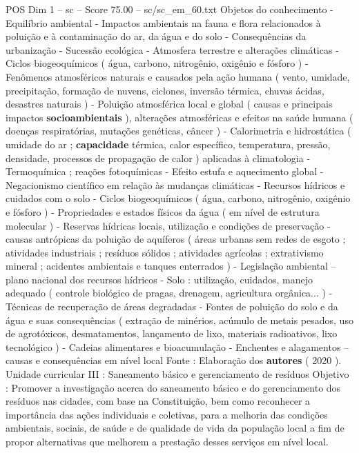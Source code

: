 \begin{textsample}{POS Dim 1 – sc – Score 75.00 – sc/sc\_em\_60.txt}
Objetos do conhecimento - Equilíbrio ambiental - Impactos ambientais na fauna e flora relacionados à poluição e à contaminação do ar, da água e do solo - Consequências da urbanização - Sucessão ecológica - Atmosfera terrestre e alterações climáticas - Ciclos biogeoquímicos ( água, carbono, nitrogênio, oxigênio e fósforo ) - Fenômenos atmosféricos naturais e causados pela ação humana ( vento, umidade, precipitação, formação de nuvens, ciclones, inversão térmica, chuvas ácidas, desastres naturais ) - Poluição atmosférica local e global ( causas e principais impactos \textbf{socioambientais} ), alterações atmosféricas e efeitos na saúde humana ( doenças respiratórias, mutações genéticas, câncer ) - Calorimetria e hidrostática ( umidade do ar ; \textbf{capacidade} térmica, calor específico, temperatura, pressão, densidade, processos de propagação de calor ) aplicadas à climatologia - Termoquímica ; reações fotoquímicas - Efeito estufa e aquecimento global - Negacionismo científico em relação às mudanças climáticas - Recursos hídricos e cuidados com o solo - Ciclos biogeoquímicos ( água, carbono, nitrogênio, oxigênio e fósforo ) - Propriedades e estados físicos da água ( em nível de estrutura molecular ) - Reservas hídricas locais, utilização e condições de preservação - causas antrópicas da poluição de aquíferos ( áreas urbanas sem redes de esgoto ; atividades industriais ; resíduos sólidos ; atividades agrícolas ; extrativismo mineral ; acidentes ambientais e tanques enterrados ) - Legislação ambiental – plano nacional dos recursos hídricos - Solo : utilização, cuidados, manejo adequado ( controle biológico de pragas, drenagem, agricultura orgânica... ) - Técnicas de recuperação de áreas degradadas - Fontes de poluição do solo e da água e suas consequências ( extração de minérios, acúmulo de metais pesados, uso de agrotóxicos, desmatamentos, lançamento de lixo, materiais radioativos, lixo tecnológico ) - Cadeias alimentares e bioacumulação - Enchentes e alagamentos – causas e consequências em nível local Fonte : Elaboração dos \textbf{autores} ( 2020 ).
Unidade curricular III : Saneamento básico e gerenciamento de resíduos Objetivo : Promover a investigação acerca do saneamento básico e do gerenciamento dos resíduos nas cidades, com base na Constituição, bem como reconhecer a importância das ações individuais e coletivas, para a melhoria das condições ambientais, sociais, de saúde e de qualidade de vida da população local a fim de propor alternativas que melhorem a prestação desses serviços em nível local.

\end{textsample}
